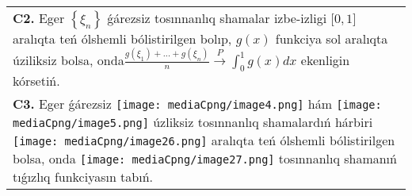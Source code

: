 \documentclass{article}
\begin{document}
\begin{tabular}{m{17cm}}
 \\
\textbf{C2.} Eger \(\left\{ \xi_{n} \right\}\) ǵárezsiz tosınnanlıq shamalar izbe-izligi \(\lbrack 0,1\rbrack\) aralıqta teń ólshemli bólistirilgen bolıp, \(g(x)\) funkciya sol aralıqta úziliksiz bolsa, onda\(\frac{g\left( \xi_{1} \right) + ... + g\left( \xi_{n} \right)}{n}\overset{P}{\rightarrow}\int_{0}^{1}{g(x)}dx\) ekenligin kórsetiń.
 \\
\textbf{C3.} Eger ǵárezsiz \texttt{[image: mediaCpng/image4.png]} hám \texttt{[image: mediaCpng/image5.png]} úzliksiz tosınnanlıq shamalardıń hárbiri \texttt{[image: mediaCpng/image26.png]} aralıqta teń ólshemli bólistirilgen bolsa, onda \texttt{[image: mediaCpng/image27.png]} tosınnanlıq shamanıń tıǵızlıq funkciyasın tabıń.
 \\

\end{tabular}
\vspace{1cm}
\end{document}
